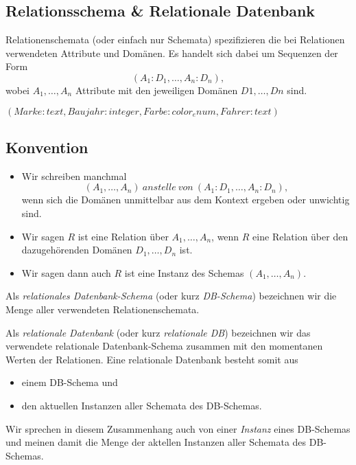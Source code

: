 \documentclass[../DatenbankenFS23.tex]{subfiles}
\begin{document}
\subsection{Relationsschema \& Relationale Datenbank}
Relationenschemata (oder einfach nur Schemata) spezifizieren die bei
Relationen verwendeten Attribute und Domänen. Es handelt sich dabei um
Sequenzen der Form
\[(A_1 : D_1, \dots , A_n : D_n) ,\]
wobei $A_1, \dots , A_n$ Attribute mit den jeweiligen Domänen $D1, \dots , Dn$ sind.

\begin{beispiel}
    $(Marke : text, Baujahr : integer, Farbe : color_enum, Fahrer : text)$
\end{beispiel}


\subsection*{Konvention}
\begin{itemize}
    \item Wir schreiben manchmal 
    \[(A_1, \dots , A_n)\ anstelle\ von\ (A_1 : D_1, \dots , A_n : D_n),\]
    wenn sich die Domänen unmittelbar aus dem Kontext ergeben oder
    unwichtig sind.
    \item Wir sagen $R$ ist eine Relation über $A_1, \dots , A_n$, wenn $R$ eine Relation
    über den dazugehörenden Domänen $D_1, \dots , D_n$ ist.
    \item Wir sagen dann auch $R$ ist eine Instanz des Schemas $(A_1, \dots , A_n)$.
\end{itemize}

\begin{bemerkung}
    Als \emph{relationales Datenbank-Schema} (oder kurz \emph{DB-Schema}) bezeichnen wir
    die Menge aller verwendeten Relationenschemata.
\end{bemerkung}
\begin{defn}
    Als \emph{relationale Datenbank} (oder kurz \emph{relationale DB}) bezeichnen wir das
    verwendete relationale Datenbank-Schema zusammen mit den momentanen
    Werten der Relationen. \newline
    Eine relationale Datenbank besteht somit aus
    \begin{itemize}
        \item einem DB-Schema und
        \item den aktuellen Instanzen aller Schemata des DB-Schemas.
    \end{itemize}
    Wir sprechen in diesem Zusammenhang auch von einer \emph{Instanz} eines
    DB-Schemas und meinen damit die Menge der aktellen Instanzen aller
    Schemata des DB-Schemas. 
\end{defn}
\end{document}
